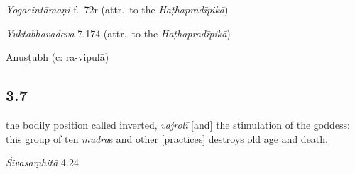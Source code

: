 \begin{ekdosis}
\begin{testimonia}[hp03_006]
\begin{versinnote}
\end{versinnote}

\emph{Yogacintāmaṇi} f.~72r (attr.~to the \emph{Haṭhapradīpikā})
\begin{versinnote}
\end{versinnote}

\emph{Yuktabhavadeva} 7.174 (attr.~to the \emph{Haṭhapradīpikā})
\begin{versinnote}
\end{versinnote}
\end{testimonia}



\begin{metre}[hp03_006]
Anuṣṭubh (c: ra-vipulā)
\end{metre}

\subsection*{3.7}
\begin{translation}[hp03_007]
[\ldots] the bodily position called inverted, \emph{vajrolī} [and] the stimulation of the goddess: this group of ten \emph{mudrā}s and other [practices] destroys old age and death. 
\end{translation}

\begin{sources}[hp03_007]
\emph{Śivasaṃhitā} 4.24
\begin{versinnote}
\end{versinnote}
\end{sources}


\end{ekdosis}

